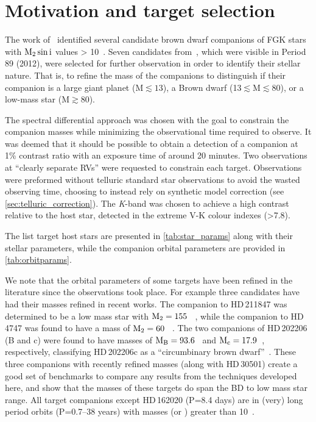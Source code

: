 \section{Motivation and target selection}
\label{sec:target_motivation}
The work of~\citet{sahlmann_search_2011} identified several candidate brown dwarf companions of FGK stars with \(\rm M_2 \sin{i}\) values > 10~\Mjup{}.
Seven candidates from~\citet{sahlmann_search_2011}, which were visible in Period 89 (2012), were selected for further observation in order to identify their stellar nature.
That is, to refine the mass of the companions to distinguish if their companion is a large giant planet (M$\apprle13$\Mjup), a Brown dwarf (13$\apprle $M$\apprle80$\Mjup), or a low-mass star (M$\apprge80$\Mjup).

The spectral differential approach was chosen with the goal to constrain the companion masses while minimizing the observational time required to observe.
It was deemed that it should be possible to obtain a detection of a companion at 1\% contrast ratio with an exposure time of around 20 minutes.
Two observations at ``clearly separate RVs'' were requested to constrain each target.
Observations were preformed without telluric standard star observations to avoid the wasted observing time, choosing to instead rely on synthetic model correction (see \cref{sec:telluric_correction}).
The \textit{K}-band was chosen to achieve a high contrast relative to the host star, detected in the extreme V-K colour indexes (>7.8).

The list target host stars are presented in \cref{tab:star_params} along with their stellar parameters, while the companion orbital parameters are provided in \cref{tab:orbitparams}.

We note that the orbital parameters of some targets have been refined in the literature since the observations took place.
For example three candidates have had their masses refined in recent works.
The companion to {HD\,211847} was determined to be a low mass star with \(\rm M_2=155~\)\Mjup{}~\citep{moutou_eccentricity_2017}, while the companion to {HD\,4747} was found to have a mass of \(\rm M_2=60~\)\Mjup{}~\citep{crepp_trends_2016}.
The two companions of {HD\,202206} (B and c) were found to have masses of \(\rm M_B =93.6\)~\Mjup{} and \(\rm M_c = 17.9\)~\Mjup{}, respectively, classifying {HD\,202206}c as a ``circumbinary brown dwarf''~\citep{benedict_hd_2017}.
These three companions with recently refined masses (along with {HD\,30501}) create a good set of benchmarks to compare any results from the techniques developed here, and show that the masses of these targets do span the BD to low mass star range.
All target companions except {HD\,162020} (P=8.4 days) are in (very) long period orbits (P=0.7--38 years) with masses (or \Mtwosini{}) greater than 10~\Mjup{}.

